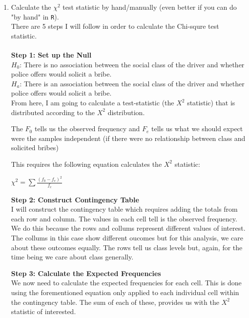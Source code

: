 \documentclass[12pt,letterpaper]{article}
\begin{document}
\begin{enumerate}
	
	\item [(a)]
	Calculate the $\chi^2$ test statistic by hand/manually (even better if you can do "by hand" in \texttt{R}).\\
	
	There are 5 steps I will follow in order to calculate the Chi-squre test statistic.\\ 
		\vspace{.05cm}\\
\textbf{Step 1: Set up the Null}\\

$H_0$: There is no association between the social class of the driver and whether police offers would solicit a  bribe.\\
$H_a$: There is an association between the social class of the driver and whether police offers would solicit a  bribe.\\

From here, I am going to calculate a test-statistic (the $X^2$ statistic) that is distributed according to the $X^2$ distribution.

The $F_0$ tells us the observed frequency and $F_e$ tells us what we should expect were the samples independent (if there were no relationship between class and solicited bribes)

This requires the following equation calculates the $X^2$ statistic:
\begin{center}
$\chi^2 = \sum \frac{(f_0 - f_e)^2}{f_e}$
\end{center}


\textbf{Step 2: Construct Contingency Table}\\ 

I will construct the contingency table which requires adding the totals from each row and column. The values in each cell tell is the observed frequency. We do this because the rows and collums represent different values of interest. The collums in this case show different oucomes but for this analysis, we care about these outcomes equally. The rows tell us class levels but, again, for the time being we care about class generally. 

\textbf{Step 3: Calculate the Expected Frequencies}\\ 

We now need to calculate the expected frequencies for each cell. This is done using the forementioned equation only applied to each individual cell within the contingency table. The sum of each of these, provides us with the  $X^2$ statistic of interested. 


\end{enumerate}
\end{document}
